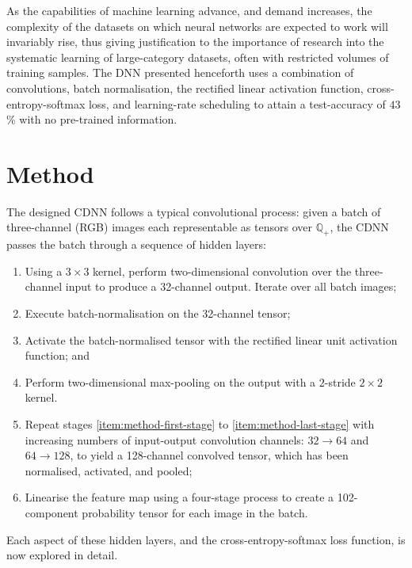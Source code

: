 \documentclass[journal]{IEEEtran}
\newcommand\networkperformance{43}
\begin{document}
As the capabilities of machine learning advance, and demand increases, the
complexity of the datasets on which neural networks are expected to work will
invariably rise, thus giving justification to the importance of research into
the systematic learning of large-category datasets, often with restricted
volumes of training samples.  The DNN presented henceforth uses a combination of
convolutions, batch normalisation, the rectified linear activation function,
cross-entropy-softmax loss, and learning-rate scheduling to attain a
test-accuracy of $\networkperformance$\% with no pre-trained information.

\section{Method}
The designed CDNN follows a typical convolutional process: given a batch of
three-channel (RGB) images each representable as tensors over $\mathbb{Q}_+$,
the CDNN passes the batch through a sequence of hidden layers:
\begin{enumerate}
    \item Using a $3 \times 3$ kernel, perform two-dimensional convolution over
        the three-channel input to produce a 32-channel output. Iterate
        over all batch images; \label{item:method-first-stage}
    \item Execute batch-normalisation on the 32-channel tensor;
    \item Activate the batch-normalised tensor with the rectified linear unit
        activation function; and
    \item Perform two-dimensional max-pooling on the output with a $2$-stride $2
        \times 2$ kernel. \label{item:method-last-stage}
    \item Repeat stages \ref{item:method-first-stage} to
        \ref{item:method-last-stage} with increasing numbers of input-output
        convolution channels: $32 \to 64$ and $64 \to 128$, to yield a
        128-channel convolved tensor, which has been normalised, activated, and
        pooled;
    \item Linearise the feature map using a four-stage process to create a
        102-component probability tensor for each image in the batch.
\end{enumerate}
Each aspect of these hidden layers, and the cross-entropy-softmax loss function,
is now explored in detail.
\end{document}
